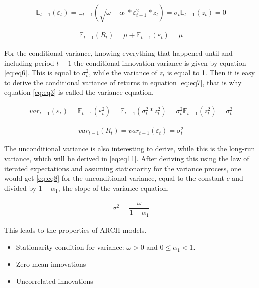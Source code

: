 \documentclass[a4paper, twoside]{templates/ociamthesis}
\begin{document}
\begin{align} 
\mathbb{E}_{t-1}(\varepsilon_{t}) = \mathbb{E}_{t-1}(\sqrt{\omega + \alpha_1 *  \varepsilon_{t-1}^2} * z_t) = \sigma_t\mathbb{E}_{t-1}(z_t) = 0
 \label{eq:eq4}
\end{align} 

\begin{align} 
\mathbb{E}_{t-1}(R_{t}) = \mu + \mathbb{E}_{t-1}(\varepsilon_{t}) = \mu
 \label{eq:eq5}
\end{align}

For the conditional variance, knowing everything that happened until and including period \(t-1\) the conditional innovation variance is given by equation \eqref{eq:eq6}. This is equal to \(\sigma_t^2\), while the variance of \(z_t\) is equal to 1. Then it is easy to derive the conditional variance of returns in equation \eqref{eq:eq7}, that is why equation \eqref{eq:eq3} is called the variance equation.

\begin{align} 
var_{t-1}(\varepsilon_t) = \mathbb{E}_{t-1}(\varepsilon_{t}^2) = \mathbb{E}_{t-1}(\sigma_t^2 * z_t^2) = \sigma_t^2\mathbb{E}_{t-1}(z_t^2) = \sigma_t^2
 \label{eq:eq6}
\end{align} 

\begin{align} 
var_{t-1}(R_t) = var_{t-1}(\varepsilon_t)= \sigma_t^2
 \label{eq:eq7}
\end{align}

The unconditional variance is also interesting to derive, while this is the long-run variance, which will be derived in \eqref{eq:eq11}. After deriving this using the law of iterated expectations and assuming stationarity for the variance process, one would get \eqref{eq:eq8} for the unconditional variance, equal to the constant \(c\) and divided by \(1-\alpha_1\), the slope of the variance equation.

\begin{align} 
\sigma^2 = \dfrac{\omega}{1-\alpha_1}
 \label{eq:eq8}
\end{align}

This leads to the properties of ARCH models.

\begin{itemize}
\item
  Stationarity condition for variance: \(\omega>0\) and \(0 \le \alpha_1 < 1\).
\item
  Zero-mean innovations
\item
  Uncorrelated innovations
\end{itemize}
\end{document}
